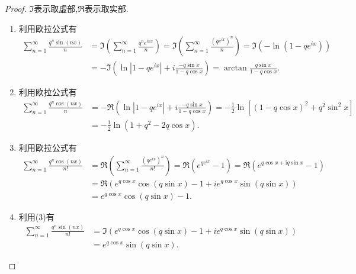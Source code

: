 \documentclass[../../main.tex]{subfiles}%
\begin{document}
\begin{proof}

$\Im$表示取虚部,$\Re$表示取实部.
\begin{enumerate}[(1)]
\item 利用欧拉公式有
\begin{align*}
\sum_{n = 1}^{\infty} \frac{q^{n} \sin(nx)}{n} &= \Im\left( \sum_{n = 1}^{\infty} \frac{q^{n} e^{inx}}{n} \right) = \Im\left( \sum_{n = 1}^{\infty} \frac{(q e^{ix})^{n}}{n} \right) = \Im(-\ln(1 - q e^{ix})) \\
&= -\Im\left( \ln|1 - q e^{ix}| + i \frac{-q \sin x}{1 - q \cos x} \right) = \arctan \frac{q \sin x}{1 - q \cos x}.
\end{align*}

\item 利用欧拉公式有
\begin{align*}
\sum_{n = 1}^{\infty} \frac{q^{n} \cos(nx)}{n} &= -\Re\left( \ln|1 - q e^{ix}| + i \frac{-q \sin x}{1 - q \cos x} \right) = -\frac{1}{2} \ln\left[(1 - q \cos x)^{2} + q^{2} \sin^{2} x\right] \\
&= -\frac{1}{2} \ln(1 + q^{2} - 2q \cos x).
\end{align*}

\item 利用欧拉公式有
\begin{align*}
\sum_{n = 1}^{\infty} \frac{q^{n} \cos(nx)}{n!} &= \Re\left( \sum_{n = 1}^{\infty} \frac{(q e^{ix})^{n}}{n!} \right) = \Re\left( e^{q e^{ix}} - 1 \right) =\Re \left( e^{q\cos x+\mathrm{i}q\sin x}-1 \right) 
\\
&= \Re\left( e^{q \cos x} \cos(q \sin x) - 1 + i e^{q \cos x} \sin(q \sin x) \right) \\
&= e^{q \cos x} \cos(q \sin x) - 1.
\end{align*}

\item 利用(3)有
\begin{align*}
\sum_{n = 1}^{\infty} \frac{q^{n} \sin(nx)}{n!} &= \Im\left( e^{q \cos x} \cos(q \sin x) - 1 + i e^{q \cos x} \sin(q \sin x) \right) \\
&= e^{q \cos x} \sin(q \sin x).
\end{align*} 
\end{enumerate}

\end{proof}
\end{document}
